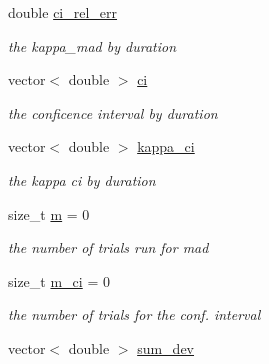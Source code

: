 \begin{DoxyCompactItemize}
\item 
double \mbox{\hyperlink{structKappaResult_ae4cbee7f19b10054eec20a22d4cfee02}{ci\+\_\+rel\+\_\+err}}
\begin{DoxyCompactList}\small\item\em the kappa\+\_\+mad by duration \end{DoxyCompactList}\item 
\mbox{\label{structKappaResult_ae5f9b611ab3439921432428ad2bdf122}} 
vector$<$ double $>$ \mbox{\hyperlink{structKappaResult_ae5f9b611ab3439921432428ad2bdf122}{ci}}
\begin{DoxyCompactList}\small\item\em the conficence interval by duration \end{DoxyCompactList}\item 
\mbox{\label{structKappaResult_a04268ef34dd883df399c63bf67b2af26}} 
vector$<$ double $>$ \mbox{\hyperlink{structKappaResult_a04268ef34dd883df399c63bf67b2af26}{kappa\+\_\+ci}}
\begin{DoxyCompactList}\small\item\em the kappa ci by duration \end{DoxyCompactList}\item 
\mbox{\label{structKappaResult_a5d2264180cefdfefd364065aaf405b72}} 
size\+\_\+t \mbox{\hyperlink{structKappaResult_a5d2264180cefdfefd364065aaf405b72}{m}} = 0
\begin{DoxyCompactList}\small\item\em the number of trials run for mad \end{DoxyCompactList}\item 
\mbox{\label{structKappaResult_a59f858c0abe9db0eebd82a56665b38df}} 
size\+\_\+t \mbox{\hyperlink{structKappaResult_a59f858c0abe9db0eebd82a56665b38df}{m\+\_\+ci}} = 0
\begin{DoxyCompactList}\small\item\em the number of trials for the conf. interval \end{DoxyCompactList}\item 
\mbox{\label{structKappaResult_a133a1322d9761ce51027209c1b344693}} 
vector$<$ double $>$ \mbox{\hyperlink{structKappaResult_a133a1322d9761ce51027209c1b344693}{sum\+\_\+dev}}

\end{DoxyCompactItemize}
